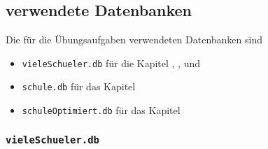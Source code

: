 \subsection[verwendete Datenbanken]{verwendete Datenbanken}
Die für die Übungsaufgaben verwendeten Datenbanken sind
\begin{itemize}
	\item \lstinline!vieleSchueler.db! für die Kapitel ,  ,  und 
	\item \lstinline!schule.db! für das Kapitel 
	\item \lstinline!schuleOptimiert.db! für das Kapitel 
\end{itemize}
\subsubsection{\lstinline!vieleSchueler.db!}

